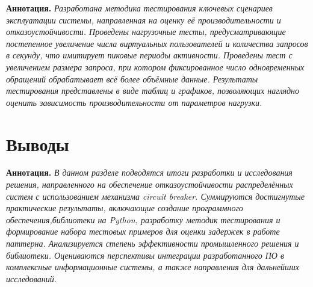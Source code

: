 \textbf{Аннотация. } \textit{Разработана методика тестирования ключевых сценариев эксплуатации системы, направленная на оценку её производительности и отказоустойчивости. Проведены нагрузочные тесты, предусматривающие постепенное увеличение числа виртуальных пользователей и количества запросов в секунду, что имитирует пиковые периоды активности.  Проведены тест с увеличением размера запроса, при котором фиксированное число одновременных обращений обрабатывает всё более объёмные данные. Результаты тестирования представлены в виде таблиц и графиков, позволяющих наглядно оценить зависимость производительности от параметров нагрузки.}




\section{Выводы}
\textbf{Аннотация. } \textit{В данном разделе подводятся итоги разработки и исследования решения, направленного на обеспечение отказоустойчивости распределённых систем с использованием механизма circuit breaker. Суммируются достигнутые практические результаты, включающие создание программного обеспечения,библиотеки на Python, разработку методик тестирования и формирование набора тестовых примеров для оценки задержек в работе паттерна. Анализируется степень эффективности промышленного решения и библиотеки. Оцениваются перспективы интеграции разработанного ПО в комплексные информационные системы, а также направления для дальнейших исследований.}


